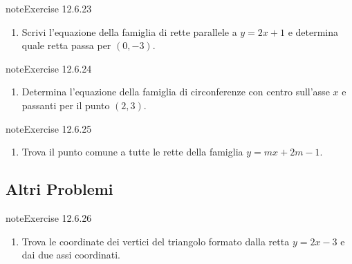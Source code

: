 \documentclass[letterpaper,10pt,italian]{jupyterBook}
\begin{document}
\begin{sphinxadmonition}{note}{Exercise 12.6.23}


\begin{enumerate}
%
\setcounter{enumi}{22}
\item {} 
\sphinxAtStartPar
Scrivi l’equazione della famiglia di rette parallele a \( y = 2x + 1 \) e determina quale retta passa per \( (0, -3) \).

\end{enumerate}
\end{sphinxadmonition}
 \label{exercise:ch/analytic_geometry/analytic_geometry_2d/problems-exercise-23}

\begin{sphinxadmonition}{note}{Exercise 12.6.24}


\begin{enumerate}
%
\setcounter{enumi}{23}
\item {} 
\sphinxAtStartPar
Determina l’equazione della famiglia di circonferenze con centro sull’asse \( x \) e passanti per il punto \( (2, 3) \).

\end{enumerate}
\end{sphinxadmonition}
 \label{exercise:ch/analytic_geometry/analytic_geometry_2d/problems-exercise-24}

\begin{sphinxadmonition}{note}{Exercise 12.6.25}


\begin{enumerate}
%
\setcounter{enumi}{24}
\item {} 
\sphinxAtStartPar
Trova il punto comune a tutte le rette della famiglia \( y = mx + 2m - 1 \).

\end{enumerate}
\end{sphinxadmonition}


\subsection{Altri Problemi}
\label{\detokenize{ch/analytic_geometry/analytic_geometry_2d/problems:altri-problemi}} \label{exercise:ch/analytic_geometry/analytic_geometry_2d/problems-exercise-25}

\begin{sphinxadmonition}{note}{Exercise 12.6.26}


\begin{enumerate}
%
\setcounter{enumi}{25}
\item {} 
\sphinxAtStartPar
Trova le coordinate dei vertici del triangolo formato dalla retta \( y = 2x - 3 \) e dai due assi coordinati.

\end{enumerate}
\end{sphinxadmonition}
 \label{exercise:ch/analytic_geometry/analytic_geometry_2d/problems-exercise-26}
\end{document}
